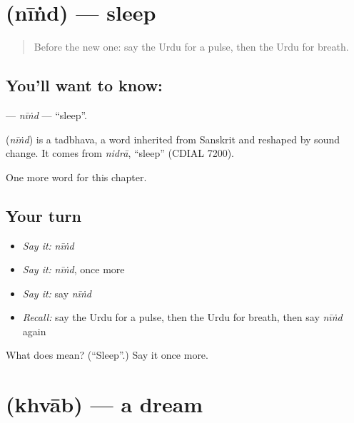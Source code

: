 \section[\texorpdfstring{\ur{نیند} (nīṅd)}{نیند (nīṅd)}]{ (nīṅd) — sleep}

\label{lesson:UR-C216-nind}



\begin{quote}
Before the new one: say the Urdu for a pulse, then the Urdu for breath.
\end{quote}

\subsection*{You'll want to know: }
\textbf{} — \emph{nīṅd} — \textquotedblleft{}sleep\textquotedblright{}.

\begin{cousinweb}
\textbf{} (\emph{nīṅd}) is a tadbhava, a word inherited from Sanskrit and reshaped by sound change. It comes from \emph{nidrā}, \textquotedblleft{}sleep\textquotedblright{} (CDIAL 7200).
\end{cousinweb}

\begin{grammarlens}[title={What you've built}]
One more word for this chapter.
\end{grammarlens}

\subsection*{Your turn}
\begin{itemize}
\raggedright
  \item \emph{Say it:} \emph{nīṅd}
  \item \emph{Say it:} \emph{nīṅd}, once more
  \item \emph{Say it:} say \emph{nīṅd}
  \item \emph{Recall:} say the Urdu for a pulse, then the Urdu for breath, then say \emph{nīṅd} again
\end{itemize}

\begin{tcolorbox}[breakable,colback=teal!4,colframe=teal!35!black,title={Before you move on}]
What does  mean? (\textquotedblleft{}Sleep\textquotedblright{}.) Say it once more.
\end{tcolorbox}
\section[\texorpdfstring{\ur{خواب} (khvāb)}{خواب (khvāb)}]{ (khvāb) — a dream}

